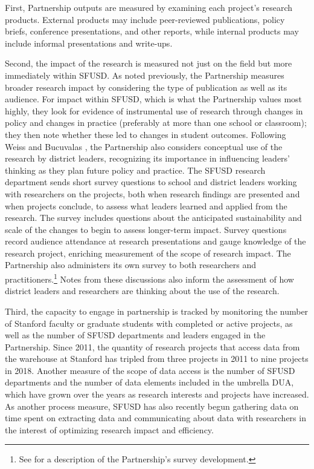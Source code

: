 \documentclass[
]{book}
\begin{document}
First, Partnership outputs are measured by examining each project's research products. External products may include peer-reviewed publications, policy briefs, conference presentations, and other reports, while internal products may include informal presentations and write-ups.

Second, the impact of the research is measured not just on the field but more immediately within SFUSD. As noted previously, the Partnership measures broader research impact by considering the type of publication as well as its audience. For impact within SFUSD, which is what the Partnership values most highly, they look for evidence of instrumental use of research through changes in policy and changes in practice (preferably at more than one school or classroom); they then note whether these led to changes in student outcomes. Following Weiss and Bucuvalas \citeyearpar{weiss1980}, the Partnership also considers conceptual use of the research by district leaders, recognizing its importance in influencing leaders' thinking as they plan future policy and practice. The SFUSD research department sends short survey questions to school and district leaders working with researchers on the projects, both when research findings are presented and when projects conclude, to assess what leaders learned and applied from the research. The survey includes questions about the anticipated sustainability and scale of the changes to begin to assess longer-term impact. Survey questions record audience attendance at research presentations and gauge knowledge of the research project, enriching measurement of the scope of research impact. The Partnership also administers its own survey to both researchers and practitioners.\footnote{See \citet{wentworth2017} for a description of the Partnership's survey development.} Notes from these discussions also inform the assessment of how district leaders and researchers are thinking about the use of the research.

Third, the capacity to engage in partnership is tracked by monitoring the number of Stanford faculty or graduate students with completed or active projects, as well as the number of SFUSD departments and leaders engaged in the Partnership. Since 2011, the quantity of research projects that access data from the warehouse at Stanford has tripled from three projects in 2011 to nine projects in 2018. Another measure of the scope of data access is the number of SFUSD departments and the number of data elements included in the umbrella DUA, which have grown over the years as research interests and projects have increased. As another process measure, SFUSD has also recently begun gathering data on time spent on extracting data and communicating about data with researchers in the interest of optimizing research impact and efficiency.
\end{document}
